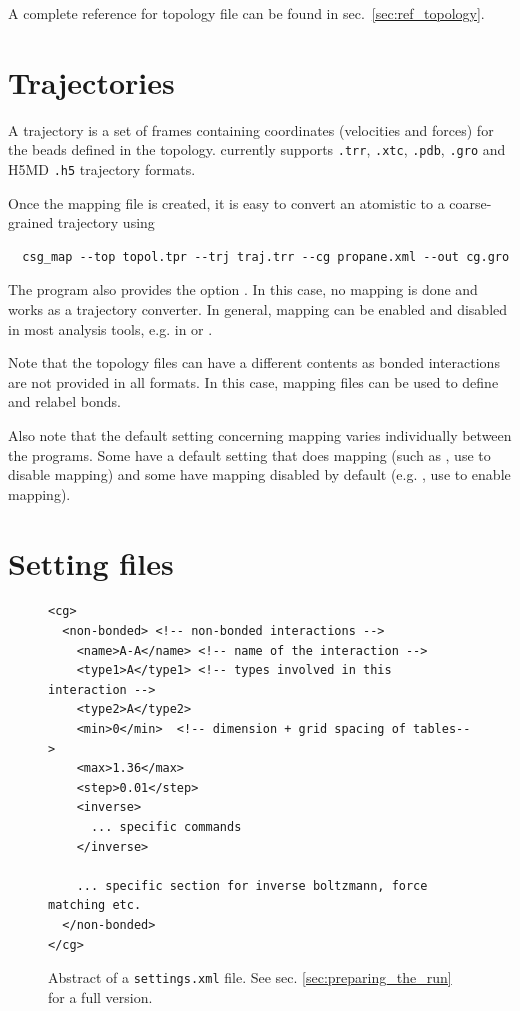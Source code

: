 A complete reference for \xml topology file can be found in sec.~\ref{sec:ref_topology}.

\section{Trajectories}
\label{sec:trajectory}

A trajectory is a set of frames containing coordinates (velocities and forces) for the beads defined in the topology. \votca currently supports \texttt{.trr}, \texttt{.xtc}, \texttt{.pdb}, \texttt{.gro} and H5MD \texttt{.h5} trajectory formats.

Once the mapping file is created, it is easy to convert an atomistic to a coarse-grained trajectory using 
\begin{verbatim}
  csg_map --top topol.tpr --trj traj.trr --cg propane.xml --out cg.gro
\end{verbatim}

The program  also provides the option . In this case, no mapping is done and  works as a trajectory converter. In general, mapping can be enabled and disabled in most analysis tools, e.g. in  or .

Note that the topology files can have a different contents as bonded interactions are not provided in all formats. In this case, mapping files can be used to define and relabel bonds.

Also note that the default setting concerning mapping varies individually between the programs. Some have a default setting that does mapping (such as , use  to disable mapping) and some have mapping disabled by default (e.g. , use  to enable mapping).

\section{Setting files}
\label{sec:setting_files}

\begin{figure}[h]
\centering
\begin{lstlisting}[frame=single]
<cg>
  <non-bonded> <!-- non-bonded interactions -->
    <name>A-A</name> <!-- name of the interaction -->
    <type1>A</type1> <!-- types involved in this interaction -->
    <type2>A</type2>
    <min>0</min>  <!-- dimension + grid spacing of tables-->
    <max>1.36</max>
    <step>0.01</step>
    <inverse>
      ... specific commands
    </inverse>

    ... specific section for inverse boltzmann, force matching etc.
  </non-bonded>
</cg>
\end{lstlisting}
\caption{Abstract of a \texttt{settings.xml} file. See sec. \ref{sec:preparing_the_run} for a full version.}
\end{figure}

